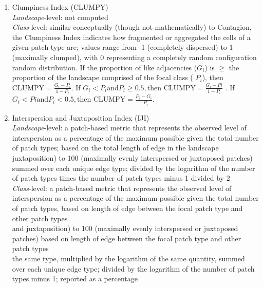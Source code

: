 \begin{enumerate}
	\item Clumpiness Index (CLUMPY)\\
	\emph{Landscape}-level: not computed  	\\
	\emph{Class}-level: similar conceptually (though not mathematically) to Contagion, the Clumpiness Index indicates how fragmented or aggregated 
the cells of a given patch type are; values range from -1 (completely dispersed) to 1 (maximally clumped), with 0 representing a completely 
random configuration 	\\
random distribution. If the proportion of like adjacencies ($G_i$) is $\geq$ the proportion of the landscape comprised of the focal class (
$P_i$), then $\text{CLUMPY} = \frac{G_i - P_i}{1 - P_i}$. If $G_i < P_i \text{and} P_i \geq 0.5, \text{then CLUMPY} = \frac{G_i - Pi}{1 - P_i}$
. If $G_i < Pi \text{and} P_i < 0.5, \text{then CLUMPY} = \frac{P_i - G_i}{-P_i}$.	\\
	
	\item Interspersion and Juxtaposition Index (IJI) \\
	\emph{Landscape}-level: a patch-based metric that represents the observed level of interspersion as a percentage of the maximum possible given 
the total number of patch types; based on the total length of edge in the landscape 	\\
juxtaposition) to 100 (maximally evenly interspersed or juxtaposed patches) 	\\
summed over each unique edge type;  divided by the logarithm of the number of patch types times the number of patch types minus 1 divided by 2 
	\\
	\emph{Class}-level: a patch-based metric that represents the observed level of interspersion as a percentage of the maximum possible given the 
total number of patch types, based on length of edge between the focal patch type and other patch types 	\\
and juxtaposition) to 100 (maximally evenly interspersed or juxtaposed patches) based on length of edge between the focal patch type and other 
patch types 	\\
the same type, multiplied by the logarithm of the same quantity, summed over each unique edge type; divided by the logarithm of the number of 
patch types minus 1; reported as a percentage	\\
	

\end{enumerate}
